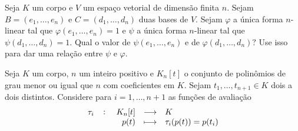 \documentclass[11pt,a4paper]{article}
\begin{document}

 Seja $K$ um corpo e $V$ um espaço vetorial de dimensão finita $n.$ Sejam $B = (e_1,\ldots ,e_n)$ e $C = (d_1, \ldots , d_n)$ duas bases de $V.$ Sejam $\varphi$ a única forma $n$-linear tal que $\varphi(e_1, \ldots ,e_n) = 1$ e $\psi$ a única forma $n$-linear tal que $\psi(d_1, \ldots, d_n) = 1.$ Qual o valor de $\psi(e_1, \ldots ,e_n)$ e de $\varphi(d_1, \ldots, d_n)?$ Use isso para dar uma relação entre $\psi$ e $\varphi.$
\solucao{}

 Seja $K$ um corpo, $n$ um inteiro positivo e $K_n[t]$ o conjunto de polinômios de grau menor ou igual que $n$ com coeficientes em $K.$ Sejam $t_1,  \ldots, t_{n+1} \in K$ dois a dois distintos. Considere para $i = 1, \ldots, n+1$ as funções de avaliação
\[\fullfunction{\tau_i}{K_n[t]}{K}{p(t)}{\tau_i(p(t)) = p(t_i)}\]
\end{document}
